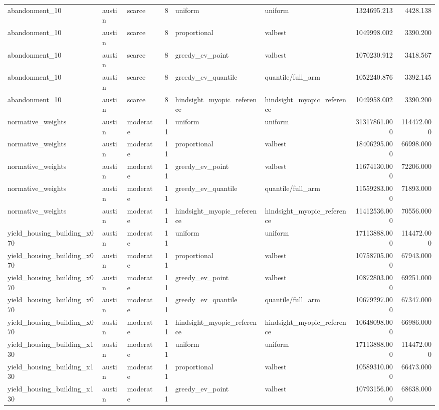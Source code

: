 \begin{tabular}{lllrllrr}
abandonment\_10 & austin & scarce & 8 & uniform & uniform & 1324695.213 & 4428.138 \\
abandonment\_10 & austin & scarce & 8 & proportional & valbest & 1049998.002 & 3390.200 \\
abandonment\_10 & austin & scarce & 8 & greedy\_ev\_point & valbest & 1070230.912 & 3418.567 \\
abandonment\_10 & austin & scarce & 8 & greedy\_ev\_quantile & quantile/full\_arm & 1052240.876 & 3392.145 \\
abandonment\_10 & austin & scarce & 8 & hindsight\_myopic\_reference & hindsight\_myopic\_reference & 1049958.002 & 3390.200 \\
normative\_weights & austin & moderate & 11 & uniform & uniform & 31317861.000 & 114472.000 \\
normative\_weights & austin & moderate & 11 & proportional & valbest & 18406295.000 & 66998.000 \\
normative\_weights & austin & moderate & 11 & greedy\_ev\_point & valbest & 11674130.000 & 72206.000 \\
normative\_weights & austin & moderate & 11 & greedy\_ev\_quantile & quantile/full\_arm & 11559283.000 & 71893.000 \\
normative\_weights & austin & moderate & 11 & hindsight\_myopic\_reference & hindsight\_myopic\_reference & 11412536.000 & 70556.000 \\
yield\_housing\_building\_x070 & austin & moderate & 11 & uniform & uniform & 17113888.000 & 114472.000 \\
yield\_housing\_building\_x070 & austin & moderate & 11 & proportional & valbest & 10758705.000 & 67943.000 \\
yield\_housing\_building\_x070 & austin & moderate & 11 & greedy\_ev\_point & valbest & 10872803.000 & 69251.000 \\
yield\_housing\_building\_x070 & austin & moderate & 11 & greedy\_ev\_quantile & quantile/full\_arm & 10679297.000 & 67347.000 \\
yield\_housing\_building\_x070 & austin & moderate & 11 & hindsight\_myopic\_reference & hindsight\_myopic\_reference & 10648098.000 & 66986.000 \\
yield\_housing\_building\_x130 & austin & moderate & 11 & uniform & uniform & 17113888.000 & 114472.000 \\
yield\_housing\_building\_x130 & austin & moderate & 11 & proportional & valbest & 10589310.000 & 66473.000 \\
yield\_housing\_building\_x130 & austin & moderate & 11 & greedy\_ev\_point & valbest & 10793156.000 & 68638.000 \\

\end{tabular}
